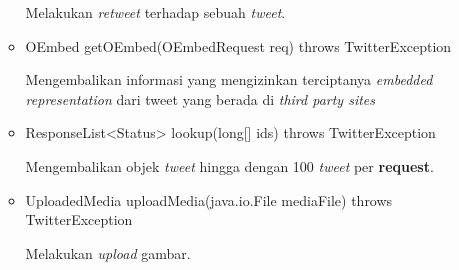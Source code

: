 \begin{itemize}
\begin{itemize}
			Melakukan \textit{retweet} terhadap sebuah \textit{tweet}.
			\item OEmbed getOEmbed(OEmbedRequest req) throws TwitterException
			
			Mengembalikan informasi yang mengizinkan terciptanya \textit{embedded representation} dari tweet yang berada di \textit{third party sites}
			\item ResponseList<Status> lookup(long[] ids) throws TwitterException
			
			Mengembalikan objek \textit{tweet} hingga dengan 100 \textit{tweet} per \textbf{request}.
			\item UploadedMedia uploadMedia(java.io.File mediaFile) throws TwitterException
			
			Melakukan \textit{upload} gambar.
		\end{itemize}
	\end{itemize}

	
